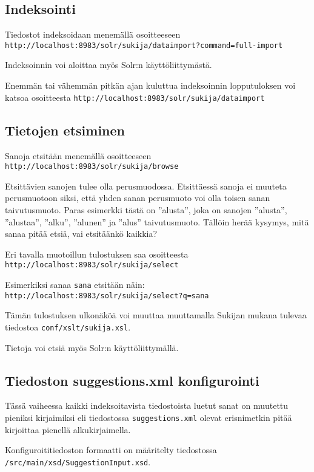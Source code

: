 \documentclass[12pt]{article}
\begin{document}
\subsection*{Indeksointi}

Tiedostot indeksoidaan menemällä osoitteeseen
\verb|http://localhost:8983/solr/sukija/dataimport?command=full-import|

Indeksoinnin voi aloittaa myös Solr:n käyttöliittymästä.

Enemmän tai vähemmän pitkän ajan kuluttua indeksoinnin lopputuloksen
voi katsoa osoitteesta
\verb|http://localhost:8983/solr/sukija/dataimport|


\subsection*{Tietojen etsiminen}

Sanoja etsitään menemällä osoitteeseen
\verb=http://localhost:8983/solr/sukija/browse=

Etsittävien sanojen tulee olla perusmuodossa. Etsittäessä sanoja ei
muuteta perusmuotoon siksi, että yhden sanan perusmuoto voi olla
toisen sanan taivutusmuoto. Paras esimerkki tästä on ''alusta'', joka
on sanojen ''alusta'', ''alustaa'', ''alku'', ''alunen'' ja ''alus''
taivutusmuoto. Tällöin herää kysymys, mitä sanaa pitää etsiä, vai
etsitäänkö kaikkia?


Eri tavalla muotoillun tulostuksen saa osoitteesta
\verb=http://localhost:8983/solr/sukija/select=

Esimerkiksi sanaa \verb=sana= etsitään näin:
\verb|http://localhost:8983/solr/sukija/select?q=sana|

Tämän tulostuksen ulkonäköä voi muuttaa muuttamalla Sukijan mukana
tulevaa tiedostoa \verb=conf/xslt/sukija.xsl=.

Tietoja voi etsiä myös Solr:n käyttöliittymällä.


\subsection*{Tiedoston suggestions.xml konfigurointi}

Tässä vaiheessa kaikki indeksoitavista tiedostoista luetut sanat on
muutettu pieniksi kirjaimiksi eli tiedostossa
\verb|suggestions.xml| olevat erisnimetkin pitää kirjoittaa
pienellä alkukirjaimella.

Konfiguroititiedoston formaatti on määritelty tiedostossa
\verb=/src/main/xsd/SuggestionInput.xsd=.
\end{document}
